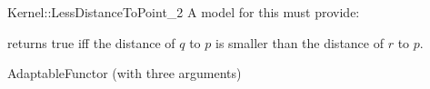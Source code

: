 \begin{ccRefFunctionObjectConcept}{Kernel::LessDistanceToPoint_2}
A model for this must provide:


{returns true iff the distance of $q$ to $p$ is
smaller than the distance of $r$ to $p$.}

\ccRefines
AdaptableFunctor (with three arguments)

\ccSeeAlso
{}\\

\end{ccRefFunctionObjectConcept}

